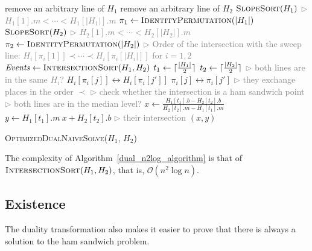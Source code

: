 \documentclass{article}
\renewcommand{\And}{\textbf{and} }
\DeclarePairedDelimiter\ceil{\lceil}{\rceil}
\def\bigo{\mathcal{O}}
\begin{document}
\begin{algorithm}
\begin{algorithmic}[1]

  remove an arbitrary line of $H_1$
 \EndIf
  remove an arbitrary line of $H _2$
 \EndIf
 \State $\textsc{SlopeSort}(H_1)$ \hfill {\small \textcolor{gray}{$\rhd$ $H_1[1].m < \cdots < H_1[|H_1|].m$}}
 \State $\pi_1 \gets \textsc{IdentityPermutation}(|H_1|)$
 \State $\textsc{SlopeSort}(H_2)$ \hfill {\small \textcolor{gray}{$\rhd$ $H_2[1].m < \cdots < H_2[|H_2|].m$}}
 \State $\pi_2 \gets \textsc{IdentityPermutation}(|H_2|)$
 \State \hfill {\small \textcolor{gray}{$\rhd$ Order of the intersection with the sweep line: $H_i[\pi_i[1]] \prec \cdots \prec H_i[\pi_i[|H_i|]]$ for $i = 1,2$}}
 \State $\mathit{Events} \gets \textsc{IntersectionSort}(H_1,H_2)$
 \State $t_1 \gets \ceil{\frac{|H_1|}2}$
 \State $t_2 \gets \ceil{\frac{|H_2|}2}$
     \hfill {\small \textcolor{gray}{$\rhd$ both lines are in the same $H_i$?}}
    \State $H_i[\pi_i[j]] \leftrightarrow H_i[\pi_i[j']]$
    \State $\pi_i[j] \leftrightarrow \pi_i[j']$ 
                   \hfill {\small \textcolor{gray}{$\rhd$ they exchange places in the order $\prec$}}
    \Else \hfill {\small \textcolor{gray}{$\rhd$ check whether the intersection is a ham sandwich point}}
       \If{$\pi_i[j] = t_i$ \And $\pi_{i'}[j'] = t_{i'}$} \hfill {\small \textcolor{gray}{$\rhd$ both lines are in the median level?}}
          \State $x \gets \frac{H_1[t_1].b - H_2[t_2].b}{H_2[t_2].m - H_1[t_1].m}$
          \State $y \gets H_1[t_1].m \ x + H_2[t_2].b$ \hfill {\small \textcolor{gray}{$\rhd$ their intersection}}
          \State \Return $(x,y)$
       \EndIf
    \EndIf
  \EndFor
\end{algorithmic}
\caption{\textsc{OptimizedDualNaiveSolve}($H_1$, $H_2$)}
\label{dual_n2log_algorithm}
\end{algorithm}

The complexity of Algorithm~\ref{dual_n2log_algorithm} is that of $\textsc{IntersectionSort}(H_1,H_2)$, that is, $\bigo(n^2 \log n)$.

\newpage
\subsection{Existence}\label{sec:existence}

The duality transformation also makes it easier to prove that there is always a solution to the ham sandwich problem.
\end{document}
